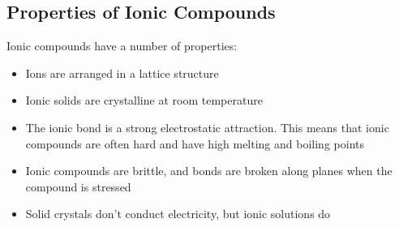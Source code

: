             \subsection{Properties of Ionic Compounds}
            \nopagebreak
        \label{m38684*id142811}Ionic compounds have a number of properties:\par 
        \label{m38684*id142815}\begin{itemize}[noitemsep]
            \label{m38684*uid72}\item Ions are arranged in a lattice structure
\label{m38684*uid73}\item Ionic solids are crystalline at room temperature
\label{m38684*uid74}\item The ionic bond is a strong electrostatic attraction. This means that ionic compounds are often hard and have high melting and boiling points
\label{m38684*uid75}\item Ionic compounds are brittle, and bonds are broken along planes when the compound is stressed
\label{m38684*uid76}\item Solid crystals don't conduct electricity, but ionic solutions do
\end{itemize}
\label{m38684*secfhsst!!!underscore!!!id522}
